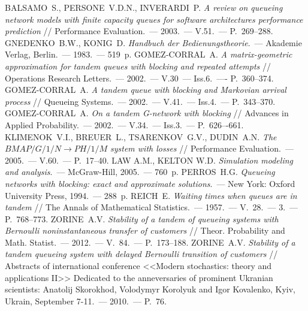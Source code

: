 \documentclass[11pt]{ubs}
\begin{document}
\begin{thebibliography}{100}
 \MakeUppercase{Balsamo~S., Persone~V.D.N., Inverardi~P.} \textit{A review on queueing network models with finite capacity queues for software architectures performance prediction} // Performance Evaluation.~--- 2003.~--- V.51.~--- P.~269--288.
 \MakeUppercase{ Gnedenko~B.W., Konig~D.} \textit{Handbuch der Bedienungstheorie}.~--- Akademie Verlag, Berlin.~--- 1983.~--- 519~p.
 \MakeUppercase{Gomez-Corral~A.} \textit{A matrix-geometric approximation for tandem queues with blocking and repeated attempts} // Operations Research Letters.~--- 2002.~--- V.30~--- Iss.6.~---- P.~360--374.
 \MakeUppercase{Gomez-Corral~A.} \textit{A tandem queue with blocking and Markovian arrival process} // Queueing Systems.~--- 2002.~--- V.41.~--- Iss.4.~--- P.~343--370.
 \MakeUppercase{Gomez-Corral~A.} \textit{On a tandem G-network with blocking} // Advances in Applied Probability.~--- 2002.~--- V.34.~--- Iss.3.~--- P.~626–-661.
 \MakeUppercase{Klimenok~V.I., Breuer~L., Tsarenkov~G.V., Dudin~A.N.} \textit{The $BMAP/G/1/N \to PH/1/M$ system with losses} // Performance Evaluation.~--- 2005.~--- V.60.~--- P.~17--40.
 \MakeUppercase{Law A.M., Kelton W.D.} \textit{Simulation modeling and analysis}.~--- McGraw-Hill, 2005.~--- 760~p.
 \MakeUppercase{Perros~H.G.}  \textit{Queueing networks with blocking: exact and approximate solutions}.~--- New York: Oxford University Press, 1994.~--- 288~p. 
 \MakeUppercase{Reich~E.}  \textit{Waiting times when queues are in tandem} // The Annals of Mathematical Statistics.~--- 1957.~--- V.~28.~--- \No{}3.~--- P.~768--773.
 \MakeUppercase{ Zorine~A.V. } \textit{Stability of a tandem of queueing systems with Bernoulli noninstantaneous transfer of customers} // Theor. Probability and Math. Statist.~--- 2012.~--- V.~84.~--- P.~173--188.
 \MakeUppercase{ Zorine~A.V.} \textit{Stability of a tandem queueing system with delayed Bernoulli transition of customers} // Abstracts of international conference <<Modern stochastics: theory and applications II>> Dedicated to the anneversaries of prominent Ukranian scientists: Anatolij Skorokhod, Volodymyr Korolyuk and Igor Kovalenko, Kyiv, Ukrain, September 7-11.~--- 2010.~--- P.~76.
\end{thebibliography}

\makeenginfo
\makeauxinfo
\end{document}
